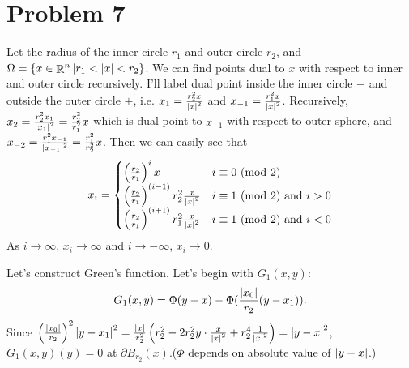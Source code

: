 \documentclass{article}
\DeclareMathOperator{\rr}{\mathbb{R}}
\newcommand{\Mod}[1]{\ (\mathrm{mod}\ #1)}
\begin{document}
\section*{Problem 7}
\begin{center}
\end{center}
Let the radius of the inner circle $r_1$ and outer circle $r_2$, and $\Omega=\{x\in \rr^n | r_1<\abs{x}<r_2\}$. We can find points dual to $x$ with respect to inner and outer circle recursively. I'll label dual point inside the inner circle $-$ and outside the outer circle $+$, i.e. $x_1=\frac{r_2^2 x}{\abs{x}^2}$ and $x_{-1}=\frac{r_1^2 x}{\abs{x}^2}$. Recursively, $x_2=\frac{r_2^2 x_1}{\abs{x_1}^2}=\frac{r_2^2}{r_1^2}x$ which is dual point to $x_{-1}$ with respect to outer sphere, and $x_{-2}=\frac{r_1^2 x_{-1}}{\abs{x_{-1}}^2}=\frac{r_1^2}{r_2^2}x$. Then we can easily see that
\begin{equation*}
x_i=
\begin{cases}
\left(\frac{r_2}{r_1}\right)^{i}x & i\equiv 0\Mod{2} \\
\left(\frac{r_2}{r_1}\right)^{(i-1)}r_2^2\frac{x}{\abs{x}^2} & i\equiv 1\Mod{2}\text{ and }i>0 \\
\left(\frac{r_2}{r_1}\right)^{(i+1)}r_1^2\frac{x}{\abs{x}^2} & i\equiv 1\Mod{2}\text{ and }i<0
\end{cases}
\end{equation*}
As $i\rightarrow \infty$, $x_i\rightarrow \infty$ and $i\rightarrow -\infty$, $x_i\rightarrow 0$.

Let's construct Green's function. Let's begin with $G_1(x,y)$:
\begin{equation*}
G_1(x,y)=\Phi(y-x)-\Phi(\frac{\abs{x_0}}{r_2}(y-x_1)).
\end{equation*}
Since $\left(\frac{\abs{x_0}}{r_2}\right)^2\abs{y-x_1}^2=\frac{\abs{x}}{r_2^2}\left(r_2^2-2r_2^2 y\cdot \frac{x}{\abs{x}^2}+r_2^4\frac{1}{\abs{x}^2}\right)=\abs{y-x}^2$, $G_1(x,y)(y)=0$ at $\partial B_{r_2}(x)$.($\Phi$ depends on absolute value of $\abs{y-x}$.)
\end{document}
